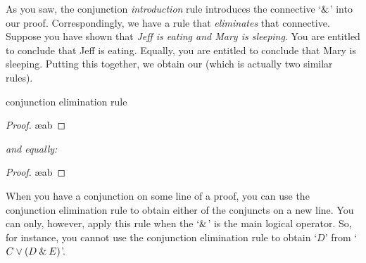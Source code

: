 As you saw, the conjunction \emph{introduction} rule introduces the connective `$\mathbin{\&}$' into our proof. Correspondingly, we have a rule that \emph{eliminates} that connective.  Suppose you have shown that \textit{Jeff is eating and Mary is sleeping}. You are entitled to conclude that Jeff is eating. Equally, you are entitled to conclude that Mary is sleeping. Putting this together, we obtain our  (which is actually two similar rules).

\begin{factboxy}{conjunction elimination rule}
\begin{proof}
	 \ae{ab}
\end{proof}
\textit{and equally:}
\begin{proof}
	 \ae{ab}
\end{proof}
\end{factboxy}
\noindent When you have a conjunction on some line of a proof, you can use the conjunction elimination rule to obtain either of the conjuncts on a new line. You can only, however, apply this rule when the `$\mathbin{\&}$' is the main logical operator. So, for instance, you cannot use the conjunction elimination rule to obtain `$D$' from `$C \vee (D \mathbin{\&} E)$'.

